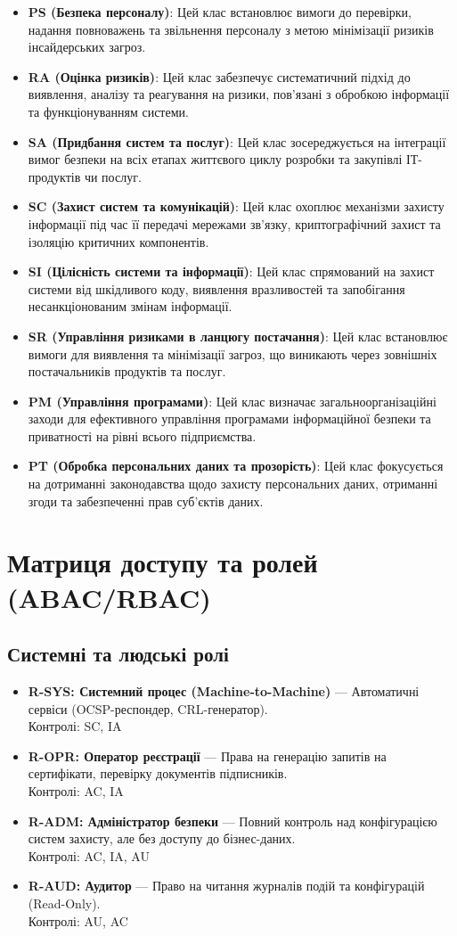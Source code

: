 \documentclass{article}
\begin{document}
\begin{itemize}
    \item \textbf{PS (Безпека персоналу)}: Цей клас встановлює вимоги до перевірки, надання повноважень та звільнення персоналу з метою мінімізації ризиків інсайдерських загроз.
    \item \textbf{RA (Оцінка ризиків)}: Цей клас забезпечує систематичний підхід до виявлення, аналізу та реагування на ризики, пов'язані з обробкою інформації та функціонуванням системи.
    \item \textbf{SA (Придбання систем та послуг)}: Цей клас зосереджується на інтеграції вимог безпеки на всіх етапах життєвого циклу розробки та закупівлі ІТ-продуктів чи послуг.
    \item \textbf{SC (Захист систем та комунікацій)}: Цей клас охоплює механізми захисту інформації під час її передачі мережами зв'язку, криптографічний захист та ізоляцію критичних компонентів.
    \item \textbf{SI (Цілісність системи та інформації)}: Цей клас спрямований на захист системи від шкідливого коду, виявлення вразливостей та запобігання несанкціонованим змінам інформації.
    \item \textbf{SR (Управління ризиками в ланцюгу постачання)}: Цей клас встановлює вимоги для виявлення та мінімізації загроз, що виникають через зовнішніх постачальників продуктів та послуг.
    \item \textbf{PM (Управління програмами)}: Цей клас визначає загальноорганізаційні заходи для ефективного управління програмами інформаційної безпеки та приватності на рівні всього підприємства.
    \item \textbf{PT (Обробка персональних даних та прозорість)}: Цей клас фокусується на дотриманні законодавства щодо захисту персональних даних, отриманні згоди та забезпеченні прав суб'єктів даних.
\end{itemize}

\newpage
\section{Матриця доступу та ролей (ABAC/RBAC)}
\subsection{Системні та людські ролі}
\begin{itemize}
\item \textbf{R-SYS: Системний процес (Machine-to-Machine)} — Автоматичні сервіси (OCSP-респондер, CRL-генератор).
\\ Контролі: SC, IA
\item \textbf{R-OPR: Оператор реєстрації} — Права на генерацію запитів на сертифікати, перевірку документів підписників.
\\ Контролі: AC, IA
\item \textbf{R-ADM: Адміністратор безпеки} — Повний контроль над конфігурацією систем захисту, але без доступу до бізнес-даних.
\\ Контролі: AC, IA, AU
\item \textbf{R-AUD: Аудитор} — Право на читання журналів подій та конфігурацій (Read-Only).
\\ Контролі: AU, AC
\end{itemize}
\end{document}
